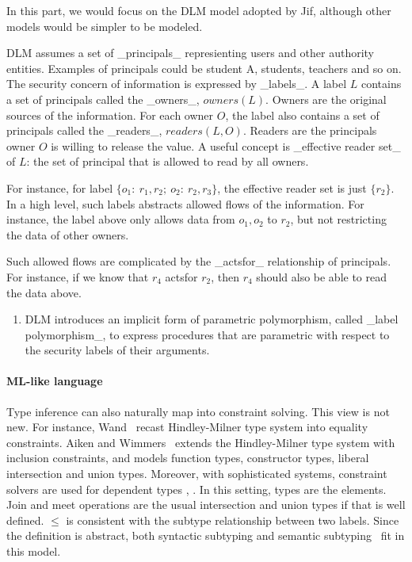 In this part, we would focus on the DLM model adopted by Jif, although
other models would be simpler to be modeled.

DLM assumes a set of _principals_ represienting users and other
authority entities. Examples of principals could be student A,
students, teachers and so on. The security concern of information is
expressed by _labels_. A label $L$ contains a set of principals called
the _owners_, $owners(L)$. Owners are the original sources of the
information. For each owner $O$, the label also contains a set of
principals called the _readers_, $readers(L,O)$. Readers are the
principals owner $O$ is willing to release the value. A useful concept
is _effective reader set_ of $L$: the set of principal that is allowed
to read by all owners.

For instance, for label $\{o_1:\ r_1,r_2;\ o_2:\ r_2,r_3\}$, the
effective reader set is just $\{r_2\}$. In a high level, such labels
abstracts allowed flows of the information. For instance, the label
above only allows data from $o_1, o_2$ to $r_2$, but not restricting
the data of other owners.

Such allowed flows are complicated by the _actsfor_ relationship of
principals. For instance, if we know that $r_4$ actsfor $r_2$, then
$r_4$ should also be able to read the data above.

\begin{enumerate}
\item DLM introduces an implicit form of parametric polymorphism, called _label
polymorphism_, to express procedures that are parametric with respect to the
security labels of their arguments.
\end{enumerate}

\paragraph{ML-like language}

Type inference can also naturally map into constraint solving. This
view is not new. For instance, Wand~\cite{wand-typeinference} recast
Hindley-Milner type system into equality constraints. Aiken and
Wimmers~\cite{aiken-typeinclusion} extends the Hindley-Milner type
system with inclusion constraints, and models function types,
constructor types, liberal intersection and union types. Moreover,
with sophisticated systems, constraint solvers are used for dependent
types , . In this setting, types are the
elements. Join and meet operations are the usual intersection and
union types if that is well defined.  $\leq$ is consistent with the
subtype relationship between two labels.  Since the definition is
abstract, both syntactic subtyping  and semantic
subtyping~\cite{aiken-typeinclusion} fit in this model.

